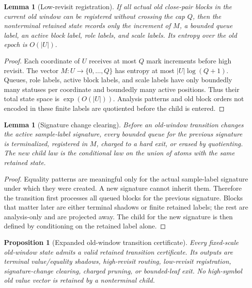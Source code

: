 \documentclass[11pt]{article}
\newtheorem{lemma}[theorem]{Lemma}
\newtheorem{proposition}[theorem]{Proposition}
\theoremstyle{remark}
\begin{document}
\begin{lemma}[Low-revisit registration]\label{lem:app-low-revisit}
If all actual old close-pair blocks in the current old window can be registered without crossing the cap $Q$, then the nonterminal retained state records only the increment of $M$, a bounded queue label, an active block label, role labels, and scale labels.  Its entropy over the old epoch is $O(|U|)$.
\end{lemma}

\begin{proof}
Each coordinate of $U$ receives at most $Q$ mark increments before high revisit.  The vector $M:U\to\{0,\ldots,Q\}$ has entropy at most $|U|\log(Q+1)$.  Queues, role labels, active block labels, and scale labels have only boundedly many statuses per coordinate and boundedly many active positions.  Thus their total state space is $\exp(O(|U|))$.  Analysis patterns and old block orders not encoded in these finite labels are quotiented before the child is entered.
\end{proof}

\begin{lemma}[Signature change clearing]\label{lem:app-signature-clear}
Before an old-window transition changes the active sample-label signature, every bounded queue for the previous signature is terminalized, registered in $M$, charged to a hard exit, or erased by quotienting.  The new child law is the conditional law on the union of atoms with the same retained state.
\end{lemma}

\begin{proof}
Equality patterns are meaningful only for the actual sample-label signature under which they were created.  A new signature cannot inherit them.  Therefore the transition first processes all queued blocks for the previous signature.  Blocks that matter later are either terminal shadows or finite retained labels; the rest are analysis-only and are projected away.  The child for the new signature is then defined by conditioning on the retained label alone.
\end{proof}

\begin{proposition}[Expanded old-window transition certificate]\label{prop:app-old-window-certificate}
Every fixed-scale old-window state admits a valid retained transition certificate.  Its outputs are terminal value/equality shadows, high-revisit routing, low-revisit registration, signature-change clearing, charged pruning, or bounded-leaf exit.  No high-symbol old value vector is retained by a nonterminal child.
\end{proposition}
\end{document}
